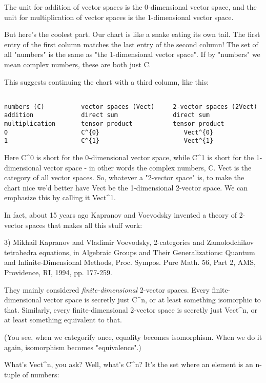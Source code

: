 The unit for addition of vector spaces is the 0-dimensional
vector space, and the unit for multiplication of vector spaces 
is the 1-dimensional vector space.  

But here's the coolest part.  Our chart is like a snake eating its own
tail.  The first entry of the first column matches the last entry of
the second column!  The set of all "numbers" is the same as
"the 1-dimensional vector space".  If by "numbers"
we mean complex numbers, these are both just C.

This suggests continuing the chart with a third column, like this:


\begin{verbatim}

numbers (C)          vector spaces (Vect)     2-vector spaces (2Vect)
addition             direct sum               direct sum
multiplication       tensor product           tensor product  
0                    C^{0}                       Vect^{0}
1                    C^{1}                       Vect^{1}
\end{verbatim}
    

Here C^{0} is short for the 0-dimensional vector space, while
C^{1} is short for the 1-dimensional vector space - in other
words the complex numbers, C.  Vect is the category of all vector
spaces.  So, whatever a "2-vector space" is, to make the
chart nice we'd better have Vect be the 1-dimensional 2-vector space.
We can emphasize this by calling it Vect^{1}.

In fact, about 15 years ago Kapranov and Voevodsky invented a 
theory of 2-vector spaces that makes all this stuff work:

3) Mikhail Kapranov and Vladimir Voevodsky, 2-categories and
Zamolodchikov tetrahedra equations, in Algebraic Groups and
Their Generalizations: Quantum and Infinite-Dimensional Methods,
Proc. Sympos. Pure Math. 56, Part 2, AMS, Providence,
RI, 1994, pp. 177-259.

They mainly considered \emph{finite-dimensional} 2-vector spaces.
Every finite-dimensional vector space is secretly just C^{n},
or at least something isomorphic to that.  Similarly, every
finite-dimensional 2-vector space is secretly just Vect^{n},
or at least something equivalent to that.

(You see, when we categorify once, equality becomes isomorphism.
When we do it again, isomorphism becomes "equivalence".)

What's Vect^{n}, you ask?  Well, what's C^{n}?  It's the set where
an element is an n-tuple of numbers:

